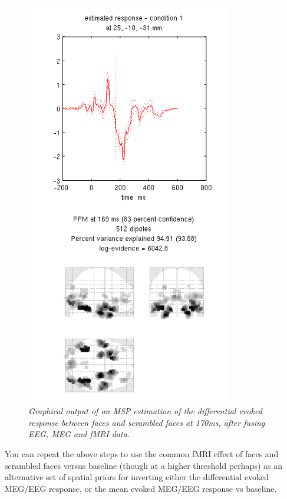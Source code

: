 \begin{figure}
\begin{center}
\includegraphics[width=90mm]{multimodal/figures/fused_eeg_meg_msp_fmri.png}
\caption{\em Graphical output of an MSP estimation of the differential evoked response between faces and scrambled faces at 170ms, after fusing EEG, MEG and fMRI data. \label{multimodal:fusion:fig:4}}
\end{center}
\end{figure}

You can repeat the above steps to use the common fMRI effect of faces and scrambled faces versus baseline (though at a higher threshold perhaps) as an alternative set of spatial priors for inverting either the differential evoked MEG/EEG response, or the mean evoked MEG/EEG response vs baseline.
